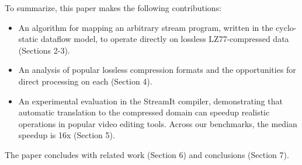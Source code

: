 To summarize, this paper makes the following contributions:
\begin{itemize}

\item An algorithm for mapping an arbitrary stream program, written in
  the cyclo-static dataflow model, to operate directly on lossless
  LZ77-compressed data (Sections 2-3).

\item An analysis of popular lossless compression formats and the
opportunities for direct processing on each (Section 4).

\item An experimental evaluation in the StreamIt compiler,
  demonstrating that automatic translation to the compressed domain
  can speedup realistic operations in popular video editing tools.
  Across our benchmarks, the median speedup is 16x (Section 5).

\end{itemize}

The paper concludes with related work (Section 6) and conclusions
(Section 7).
